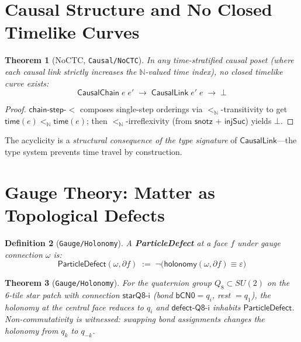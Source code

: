 \documentclass[11pt,a4paper]{article}
\newtheorem{theorem}{Theorem}[section]
\newtheorem{definition}[theorem]{Definition}
\newcommand{\N}{\mathbb{N}}
\newcommand{\module}[1]{\texttt{#1}}
\begin{document}
\section{Causal Structure and No Closed Timelike Curves}
\label{sec:causal}

\begin{theorem}[NoCTC, \module{Causal/NoCTC}]
\label{thm:noctc}
In any time-stratified causal poset (where each causal link strictly
increases the $\N$-valued time index), no closed timelike curve
exists:
\[
  \mathsf{CausalChain}\; e\; e'
  \;\to\; \mathsf{CausalLink}\; e'\; e
  \;\to\; \bot
\]
\end{theorem}

\begin{proof}
$\mathsf{chain\text{-}step\text{-}<}$ composes single-step
orderings via $<_\N$-transitivity to get
$\mathsf{time}(e) <_\N \mathsf{time}(e)$; then
$<_\N$-irreflexivity (from $\mathsf{snotz}$ + $\mathsf{injSuc}$)
yields $\bot$.
\end{proof}

The acyclicity is a \emph{structural consequence of the type
signature} of $\mathsf{CausalLink}$---the type system prevents
time travel by construction.

\section{Gauge Theory: Matter as Topological Defects}
\label{sec:gauge}

\begin{definition}[\module{Gauge/Holonomy}]
A \textbf{ParticleDefect} at a face $f$ under gauge connection
$\omega$ is:
\[
  \mathsf{ParticleDefect}(\omega, \partial f)
  \;:=\;
  \neg\bigl(\mathsf{holonomy}(\omega, \partial f)
  \equiv \varepsilon\bigr)
\]
\end{definition}

\begin{theorem}[\module{Gauge/Holonomy}]
For the quaternion group $Q_8 \subset SU(2)$ on the 6-tile star
patch with connection $\mathsf{starQ8\text{-}i}$ (bond
$\mathsf{bCN0} = q_i$, rest $= q_1$), the holonomy at the central
face reduces to $q_i$ and $\mathsf{defect\text{-}Q8\text{-}i}$
inhabits $\mathsf{ParticleDefect}$.  Non-commutativity is witnessed:
swapping bond assignments changes the holonomy from $q_k$ to
$q_{-k}$.
\end{theorem}
\end{document}
